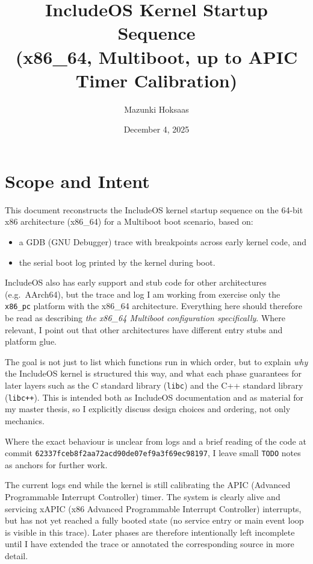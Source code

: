 \documentclass[a4paper,11pt]{article}
\title{IncludeOS Kernel Startup Sequence\\(x86\_64, Multiboot, up to APIC Timer Calibration)}
\author{Mazunki Hoksaas}
\date{December 4, 2025}
\begin{document}
\maketitle

\section{Scope and Intent}

This document reconstructs the IncludeOS kernel startup sequence on
the 64-bit x86 architecture (x86\_64) for a Multiboot boot scenario,
based on:

\begin{itemize}
  \item a GDB (GNU Debugger) trace with breakpoints across early kernel
        code, and
  \item the serial boot log printed by the kernel during boot.
\end{itemize}

IncludeOS also has early support and stub code for other architectures
(e.g.\ AArch64), but the trace and log I am working from exercise only
the \texttt{x86\_pc} platform with the x86\_64 architecture. Everything
here should therefore be read as describing \emph{the x86\_64 Multiboot
configuration specifically}. Where relevant, I point out that other
architectures have different entry stubs and platform glue.

The goal is not just to list which functions run in which order, but to
explain \emph{why} the IncludeOS kernel is structured this way, and what
each phase guarantees for later layers such as the C standard library
(\texttt{libc}) and the C++ standard library (\texttt{libc++}). This is
intended both as IncludeOS documentation and as material for my master
thesis, so I explicitly discuss design choices and ordering, not only
mechanics.

Where the exact behaviour is unclear from logs and a brief reading of
the code at commit
\texttt{62337fceb8f2aa72acd90de07ef9a3f69ec98197}, I leave small
\texttt{TODO} notes as anchors for further work.

The current logs end while the kernel is still calibrating the APIC
(Advanced Programmable Interrupt Controller) timer. The system is
clearly alive and servicing xAPIC (x86 Advanced Programmable Interrupt
Controller) interrupts, but has not yet reached a fully booted state (no
service entry or main event loop is visible in this trace). Later phases
are therefore intentionally left incomplete until I have extended the
trace or annotated the corresponding source in more detail.
\end{document}
